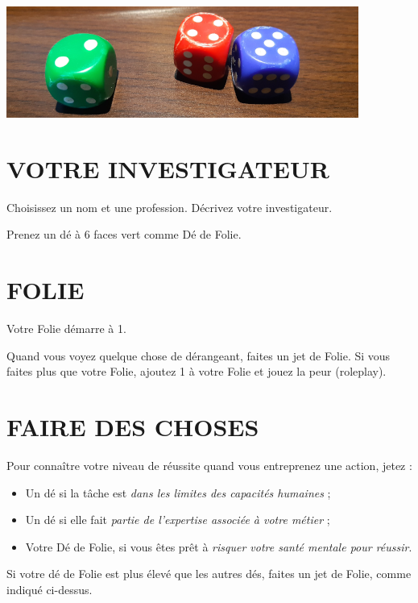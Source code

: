 \newpage
\pagestyle{fancy}

\begin{center}
\includegraphics[scale=0.6]{des-petit}
\end{center}

\section{VOTRE INVESTIGATEUR}

Choisissez un nom et une profession. Décrivez votre investigateur.

Prenez un dé à 6 faces vert comme Dé de Folie.

\section{FOLIE}

Votre Folie démarre à 1.

Quand vous voyez quelque chose de dérangeant, faites un jet de Folie. Si vous faites plus que votre Folie, ajoutez 1 à votre Folie et jouez la peur (roleplay).

\section{FAIRE DES CHOSES}

Pour connaître votre niveau de réussite quand vous entreprenez une action, jetez :

\begin{itemize}
\item Un dé si la tâche est \textit{dans les limites des capacités humaines} ;
\item Un dé si elle fait \textit{partie de l'expertise associée à votre métier} ;
\item Votre Dé de Folie, si vous êtes prêt à \textit{risquer votre santé mentale pour réussir}.
\end{itemize}

Si votre dé de Folie est plus élevé que les autres dés, faites un jet de Folie, comme indiqué ci-dessus.

